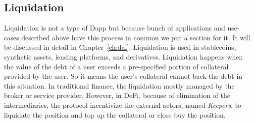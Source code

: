 \subsection{Liquidation} 
Liquidation is not a type of Dapp but because bunch of applications and use-cases described above have this process in common we put a section for it. It will be discussed in detail in Chapter~\ref{ch:dai}. Liquidation is used in stablecoins, synthetic assets, lending platforms, and derivatives. Liquidation happens when the value of the debt of a user exceeds a pre-specified portion of collateral provided by the user. So it means the user's collateral cannot back the debt in this situation. In traditional finance, the liquidation mostly managed by the broker or service provider. However, in DeFi, because of elimination of the intermediaries, the protocol incentivize the external actors, named \textit{Keepers}, to liquidate the position and top up the collateral or close buy the position.